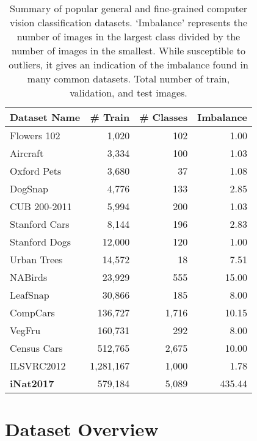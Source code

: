 \documentclass[10pt,twocolumn,letterpaper]{article}
\begin{document}
\begin{table}[t]
\small
\begin{center}
\begin{tabular}{ |l|r|r|r| }\hline 
{\bf Dataset Name} & {\bf\# Train}&{\bf \# Classes}&{\bf Imbalance}\\\hline
Flowers 102 \cite{nilsback2006visual} & 1,020 & 102 & 1.00\\
Aircraft \cite{maji2013fine} & 3,334 & 100 & 1.03 \\ Oxford Pets \cite{parkhi12a} & 3,680 & 37 &  1.08\\  DogSnap \cite{liu2012dog} & 4,776 & 133 & 2.85 \\
CUB 200-2011 \cite{wah2011caltech} & 5,994  & 200  & 1.03  \\
Stanford Cars \cite{krause20133d} & 8,144 & 196 & 2.83 \\
Stanford Dogs \cite{KhoslaYaoJayadevaprakashFeiFei_FGVC2011} & 12,000 & 120 & 1.00 \\   Urban Trees \cite{wegner2016cataloging} &14,572 & 18 & 7.51\\  
NABirds \cite{van2015building} & 23,929 & 555 & 15.00 \\ 
LeafSnap \cite{kumar2012leafsnap} & 30,866 & 185 & 8.00\\
CompCars \cite{yang2015large} & 136,727 & 1,716 & 10.15\\   
VegFru \cite{hou2017vegfru} & 160,731 & 292 & 8.00\\
Census Cars \cite{gebru2017fine} & 512,765 & 2,675 & 10.00\\ ILSVRC2012 \cite{russakovsky2015imagenet} & 1,281,167 & 1,000 & 1.78 \\ {\bf iNat2017} & 579,184 & 5,089 & 435.44\\ \hline
\end{tabular}
\end{center}
\caption{Summary of popular general and fine-grained computer vision classification datasets. 
`Imbalance' represents the number of images in the largest class divided by the number of images in the smallest. 
While susceptible to outliers, it gives an indication of the imbalance found in many common datasets. 
Total number of train, validation, and test images.}
\label{tab:rel_datasets}
\end{table}


\section{Dataset Overview}
\label{sec:dataset_overview}
\end{document}
